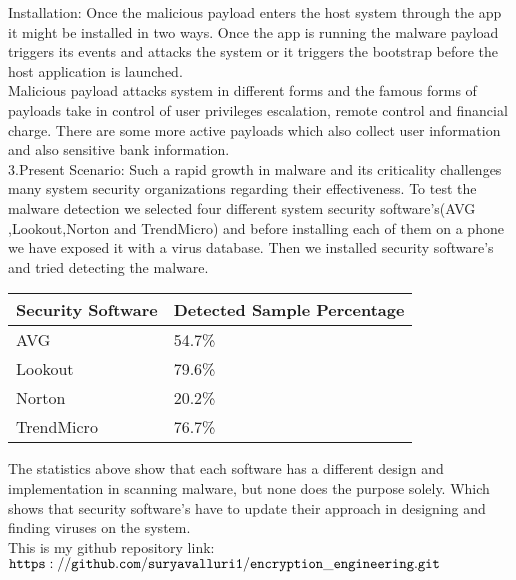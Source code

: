 \documentclass{article}
\begin{document}
Installation: Once the malicious payload enters the host system through the app it might be installed in two ways. Once the app is running the malware payload triggers its events and attacks the system or it triggers the bootstrap before the host application is launched.\\

Malicious payload attacks system in different forms and the famous forms of payloads take in control of user privileges escalation, remote control and financial charge. There are some more active payloads which also collect user information and also sensitive bank information.\\

3.Present Scenario: Such a rapid growth in malware and its criticality challenges many system security organizations regarding their effectiveness. To test the malware detection we selected four different system security software's(AVG\\,Lookout,Norton and TrendMicro) and before installing each of them on a phone we have exposed it with a virus database. Then we installed security software's and tried detecting the malware. \\

\begin{center}
\begin{tabular}{ |p{3cm}||p{3cm}| }
\hline
Security Software & Detected Sample Percentage \\ 
\hline
AVG & 54.7\%  \\ 
\hline
Lookout & 79.6\%  \\ 
\hline
Norton & 20.2\% \\
\hline
TrendMicro & 76.7\% \\
\hline
\end{tabular}
\end{center}


The statistics above show that each software has a different design and implementation in scanning malware, but none does the purpose solely. Which shows that security software's have to update their approach in designing and finding viruses on the system.\\

This is my github repository link: {$\tt https://github.com/suryavalluri1/encryption\_engineering.git $}
\end{document}
